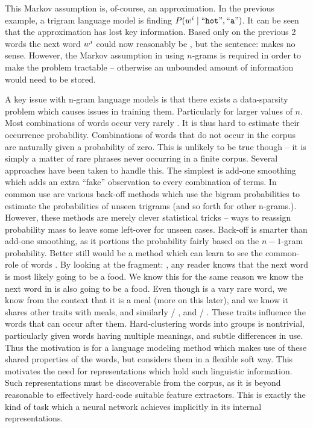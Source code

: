 \documentclass[parskip]{komatufte}
\begin{document}
This Markov assumption is, of-course, an approximation.
In the previous example, a trigram language model is finding $P(\n w_i \mid \natlang{hot}, \natlang{a})$.
It can be seen that the approximation has lost key information.
Based only on the previous 2 words the next word $\n w_i$ could now reasonably be , but the sentence:  makes no sense.
However, the Markov assumption in using $n$-grams is required in order to make the problem tractable -- otherwise an unbounded amount of information would need to be stored. 

A key issue with n-gram language models is that there exists a data-sparsity problem which causes issues in training them.
Particularly for larger values of $n$.
Most combinations of words occur very rarely .
It is thus hard to estimate their occurrence probability.
Combinations of words that do not occur in the corpus are naturally given a probability of zero.
This is unlikely to be true though -- it is simply a matter of rare phrases never occurring in a finite corpus.
Several approaches have been taken to handle this.
The simplest is add-one smoothing which adds an extra ``fake'' observation to every combination of terms.
In common use are various back-off methods  which use the bigram probabilities to estimate the probabilities of unseen trigrams (and so forth for other n-grams.).
%
%
However, these methods are merely clever statistical tricks -- ways to reassign probability mass  to leave some left-over for unseen cases.
Back-off is smarter than add-one smoothing, as it portions the probability fairly based on the $n{-}1$-gram probability.
Better still would be a method which can learn to see the common-role of words .
By looking at the fragment: , any reader knows that the next word is most likely going to be a food.
We know this for the same reason we know the next word in  is also going to be a food.
Even though  is a vary rare word, we know from the context that it is a meal (more on this later), and we know it shares other traits with meals, and similarly  / , and  / .
These traits influence the words that can occur after them.
Hard-clustering words into groups is nontrivial, particularly given words having multiple meanings, and subtle differences in use.
Thus the motivation is for a language modeling method which makes use of these shared properties of the words, but considers them in a flexible soft way.
This motivates the need for representations which hold such linguistic information.
Such representations must be discoverable from the corpus, as it is beyond reasonable to effectively hard-code suitable feature extractors.
This is exactly the kind of task which a neural network achieves implicitly in its internal representations.
\end{document}
